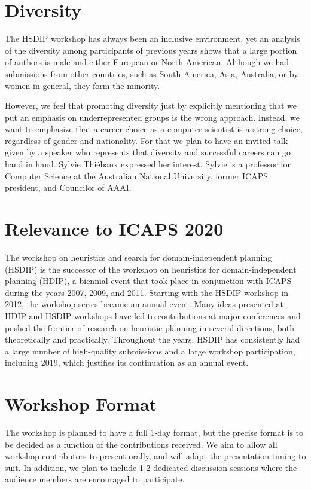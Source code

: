 \documentclass[10pt]{article}
\begin{document}
\section*{Diversity}
The HSDIP workshop has always been an inclusive environment, yet an analysis
of the diversity among participants of previous years shows that a large portion
of authors is male and either European or North American. Although we had
submissions from other countries, such as South America, Asia, Australia, or
by women in general, they form the minority.

However, we feel that promoting diversity just by explicitly mentioning that we
put an emphasis on underrepresented groups is the wrong approach. Instead, we
want to emphasize that a career choice as a computer scientist is a strong choice,
regardless of gender and nationality. For that we plan to have an invited talk
given by a speaker who represents that diversity and successful careers can go
hand in hand. Sylvie Thi{\'e}baux expressed her interest. Sylvie is a professor
for Computer Science at the Australian National University, former ICAPS
president, and Councilor of AAAI.

\section*{Relevance to ICAPS 2020}

The workshop on heuristics and search for domain-independent planning (HSDIP) is
the successor of the workshop on heuristics for domain-independent planning
(HDIP), a biennial event that took place in conjunction with ICAPS during the
years 2007, 2009, and 2011. Starting with the HSDIP workshop in 2012, the
workshop series became an annual event.
Many ideas presented at HDIP and HSDIP workshops have led to contributions at
major conferences and pushed the frontier of research on heuristic planning in
several directions, both theoretically and practically.
Throughout the years, HSDIP has consistently had a large number of
high-quality submissions and a large workshop participation, including 2019,
which justifies its continuation as an annual event.

\section*{Workshop Format}

The workshop is planned to have a full 1-day format, but the precise
format is to be decided as a function of the contributions received.
We aim to allow all workshop contributors to present orally, and will
adapt the presentation timing to suit. In addition, we plan to include
1-2 dedicated discussion sessions where the audience members are
encouraged to participate.
\end{document}
